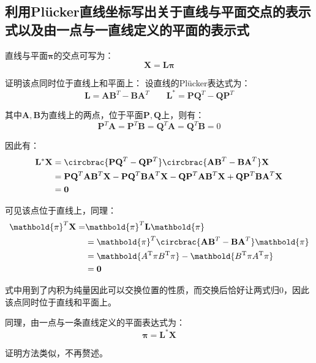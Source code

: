 \documentclass[11pt]{article}
\begin{document}
\subsection{利用Plücker直线坐标写出关于直线与平面交点的表示式以及由一点与一直线定义的平面的表示式}
直线与平面$\mathbold{\pi}$的交点可写为：
\begin{equation*}
  \mathbold{X}=\mathbold{L}\mathbold{\pi}
\end{equation*}\par
证明该点同时位于直线上和平面上：
设直线的Plücker表达式为：
\begin{equation*}
  \mathbold{L}=\mathbf{AB}^T-\mathbf{BA}^T\qquad\mathbf{L}^*=\mathbf{PQ}^T-\mathbf{QP}^T
\end{equation*}\par
其中$\mathbf{A,B}$为直线上的两点，位于平面$\mathbf{P,Q}$上，则有：
\begin{equation*}
  \mathbf{P}^T\mathbf{A}=\mathbf{P}^T\mathbf{B}=\mathbf{Q}^T\mathbf{A}=\mathbf{Q}^T\mathbf{B}=0
\end{equation*}\par
因此有：
\begin{align*}
  \mathbf{L^*X} & =\circbrac{\mathbf{PQ}^T-\mathbf{QP}^T}\circbrac{\mathbf{AB}^T-\mathbf{BA}^T}\mathbf{X}                                                              \\
                & =\mathbf{PQ}^T\mathbf{AB}^T\mathbf{X}-\mathbf{PQ}^T\mathbf{BA}^T\mathbf{X}-\mathbf{QP}^T\mathbf{AB}^T\mathbf{X}+\mathbf{QP}^T\mathbf{BA}^T\mathbf{X} \\
                & =\mathbf{0}
\end{align*}\par
可见该点位于直线上，同理：
\begin{align*}
  \mathbold{\pi}^T\mathbf{X}= & \mathbold{\pi}^T\mathbf{L}\mathbold{\pi}                                               \\
                              & =\mathbold{\pi}^T\circbrac{\mathbf{AB}^T-\mathbf{BA}^T}\mathbold{\pi}                  \\
                              & =\mathbold{A^\mathrm{T}\pi B^\mathrm{T}\pi}-\mathbold{B^\mathrm{T}\pi A^\mathrm{T}\pi} \\
                              & =\mathbf{0}
\end{align*}\par
式中用到了内积为纯量因此可以交换位置的性质，而交换后恰好让两式归0，因此该点同时位于直线和平面上。\par
同理，由一点与一条直线定义的平面表达式为：
\begin{equation*}
  \mathbold{\pi}=\mathbold{L^*}\mathbold{X}
\end{equation*}\par
证明方法类似，不再赘述。
\end{document}
